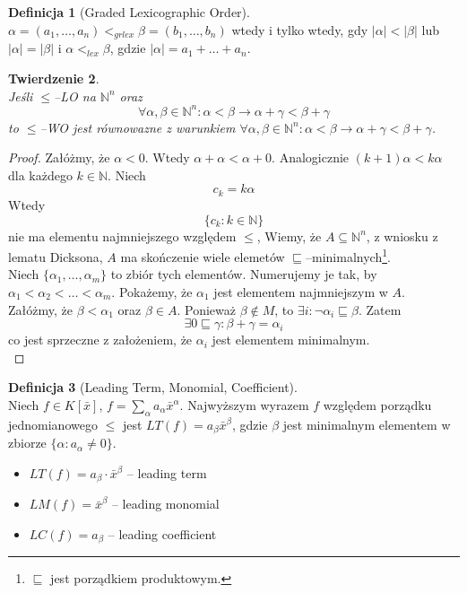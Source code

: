 \documentclass[11pt,a4paper]{article}
\newtheorem{twierdzenie}{Twierdzenie}[section]
\theoremstyle{definition}
\newtheorem{definicja}[twierdzenie]{Definicja}
\theoremstyle{remark}
\begin{document}
\begin{definicja}[Graded Lexicographic Order]~\\
    $\alpha = (a_1, \dots, a_n) <_{grlex} \beta = (b_1, \dots, b_n)$ wtedy i tylko wtedy, gdy $|\alpha| < |\beta|$ lub $|\alpha| = |\beta|$ i $\alpha <_{lex} \beta$, gdzie $|\alpha| = a_1 + \dots + a_n$.
\end{definicja}
\begin{twierdzenie}~\\
    Jeśli $\leq$--LO na $\mathbb{N}^n$ oraz 
    \[
        \forall \alpha, \beta \in \mathbb{N}^n: \alpha < \beta \rightarrow \alpha + \gamma < \beta + \gamma
    \]
    to $\leq$--WO jest równowazne z warunkiem $\forall \alpha, \beta \in \mathbb{N}^n: \alpha < \beta \rightarrow \alpha + \gamma < \beta + \gamma$.
\end{twierdzenie}
\begin{proof}
    Załóżmy, że $\alpha <0$. Wtedy $\alpha + \alpha < \alpha + 0$. Analogicznie $(k+1)\alpha < k\alpha$ dla każdego $k \in \mathbb{N}$. Niech 
    \[
        c_k = k\alpha
    \]
    Wtedy
    \[
        \{ c_k: k \in \mathbb{N} \}
    \] nie ma elementu najmniejszego względem $\leq$,
    Wiemy, że $A\subseteq \mathbb{N}^n$, z wniosku z lematu Dicksona, $A$ ma skończenie wiele elemetów $\sqsubseteq$--minimalnych\footnote{$\sqsubseteq$ jest porządkiem produktowym.}.\\
    Niech $\{\alpha_1, \dots, \alpha_m\}$ to zbiór tych elementów. Numerujemy je tak, by $\alpha_1 < \alpha_2 < \dots < \alpha_m$. Pokażemy, że $\alpha_1$ jest elementem najmniejszym w $A$. \\
    Załóżmy, że $\beta < \alpha_1$ oraz $\beta \in A$. Ponieważ $\beta \notin M$, to $\exists i:\neg \alpha_i \sqsubseteq \beta$. Zatem
    \[
        \exists 0 \sqsubseteq \gamma: \beta + \gamma = \alpha_i
    \]
    co jest sprzeczne z założeniem, że $\alpha_i$ jest elementem minimalnym.\\
\end{proof}
\begin{definicja}[Leading Term, Monomial, Coefficient]~\\
    Niech $f \in K[\bar{x}]$, $f = \sum_{\alpha} a_\alpha \bar{x}^\alpha$. Najwyższym wyrazem $f$ względem porządku jednomianowego $\leq$ jest $LT(f) = a_\beta \bar{x}^\beta$, gdzie $\beta$ jest minimalnym elementem w zbiorze $\{\alpha: a_\alpha \neq 0\}$.
    \begin{itemize}
        \item $LT(f) = a_\beta \cdot \bar{x}^\beta$ -- leading term
        \item $LM(f) = \bar{x}^\beta$ -- leading monomial
        \item $LC(f) = a_\beta$ -- leading coefficient
    \end{itemize}
\end{definicja}
\end{document}

